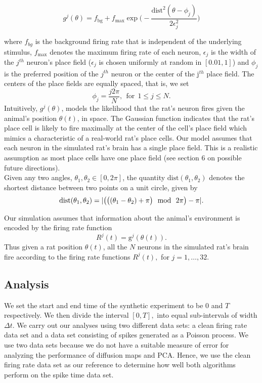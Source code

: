 \begin{equation}
{g}^{j}(\theta) = \displaystyle  f_{\text{bg}} + f_{\max} 
\exp\bigg(-\dfrac{\text{dist}^{2}(\theta - \phi_{j})}{2\epsilon_{j}^{2}} \bigg)
\end{equation}

where $f_{bg}$ is the background firing rate that is independent of the underlying stimulus, $f_{\max}$ denotes the maximum firing rate of each neuron, $\epsilon_j $  is the width of the $j^{th}$ neuron's place field ($\epsilon_j$ is chosen uniformly at random in  $[0.01, 1]$)  and $\phi_{j}$ is the preferred position of the $j^{th}$  neuron or the center of the j$^{th}$ place field. The centers of the place fields are equally spaced, that is, we set
$$\phi_j = \frac{j2\pi}{N}, \ \    \text{for}   \ \    1 \leq j \leq N.$$
Intuitively, $g^{j}(\theta)$, models  the likelihood that the rat's neuron fires given the animal's position $\theta(t)$, in space.
The Gaussian function indicates that the rat's place cell is  likely to fire maximally  at the center of the cell's place field
which mimics a characteristic  of a real-world rat's place cells.
Our model assumes that each neuron in the simulated rat's brain has a single place field. This is a realistic assumption as 
most place cells have one place field (see section 6 on possible future directions). \\

Given any two angles, $\theta_{1}, \theta_{2} \in [0, 2\pi]$, the quantity
$\text{dist}(\theta_{1}, \theta_{2})$ denotes the shortest distance between 
two points on a unit circle, given by
\[
\text{dist}(\theta_{1}, \theta_{2}) = \abs{\big( \big( (\theta_{1} - \theta_{2}) + \pi  \big) \ \ \text{mod} \ \ 2\pi \big) - \pi}.
\]

Our simulation assumes  that information about the animal's environment is  encoded by the firing rate function
$$R^{j}(t) =  \text{g}^{j}(\theta(t)).$$
Thus given a rat position $\theta(t)$, all the $N$ neurons  in the simulated rat's brain fire according to the firing rate functions  $R^{j}(t),$ for $j = 1, \ldots, 32.$


\subsection{Analysis}
We set the start  and end time of the synthetic experiment  to be  $0$ and $T$ respectively. We then divide the interval
$[0, T],$ into equal sub-intervals  of width $\Delta t$.
We carry out  our analyses  using two different data sets:  a clean firing rate data set and a data set consisting of spikes generated as a Poisson process.
We use two data sets because we do not have a suitable measure of error for analyzing the performance of diffusion maps
and PCA. Hence, we use the clean firing rate data set as our reference to determine how well both algorithms perform
on the spike time data set.\\

